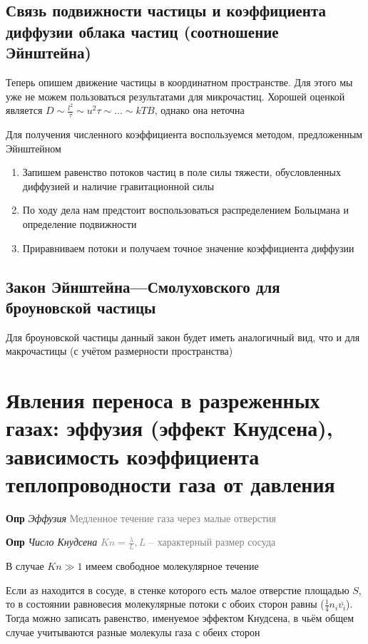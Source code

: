 \documentclass[a4paper, 14pt]{article}
\begin{document}
    \subsection{Связь подвижности частицы и коэффициента диффузии облака частиц (соотношение Эйнштейна)}

    Теперь опишем движение частицы в координатном пространстве.
    Для этого мы уже не можем пользоваться результатами для микрочастиц.
    Хорошей оценкой является $D \sim \frac{l^2}{\tau} \sim u^2 \tau \sim \dots \sim kTB$, однако она неточна

    Для получения численного коэффициента воспользуемся методом, предложенным Эйнштейном
    \begin{enumerate}
        \item Запишем равенство потоков частиц в поле силы тяжести, обусловленных диффузией и наличие гравитационной
        силы
        \item По ходу дела нам предстоит воспользоваться распределением Больцмана и определение подвижности
        \item Приравниваем потоки и получаем точное значение коэффициента диффузии
    \end{enumerate}

    \subsection{Закон Эйнштейна—Смолуховского для броуновской частицы}

    Для броуновской частицы данный закон будет иметь аналогичный вид, что и для макрочастицы (с учётом размерности
    пространства)

    \section{Явления переноса в разреженных газах: эффузия (эффект Кнудсена), зависимость коэффициента
    теплопроводности газа от давления}

    \textbf{Опр} \textit{Эффузия} \textcolor{gray}{Медленное течение газа через малые отверстия}

    \textbf{Опр} \textit{Число Кнудсена} \textcolor{gray}{$Kn = \frac{\lambda}{L}, L$ -- характерный размер сосуда}

    В случае $Kn \gg 1$ имеем свободное молекулярное течение

    Если аз находится в сосуде, в стенке которого есть малое отверстие площадью $S$, то в состоянии равновесия
    молекулярные потоки с обоих сторон равны ($\frac{1}{4} n_i \overline{v_i}$).
    Тогда можно записать равенство, именуемое эффектом Кнудсена, в чьём общем случае учитываются разные молекулы газа
    с обеих сторон
\end{document}
